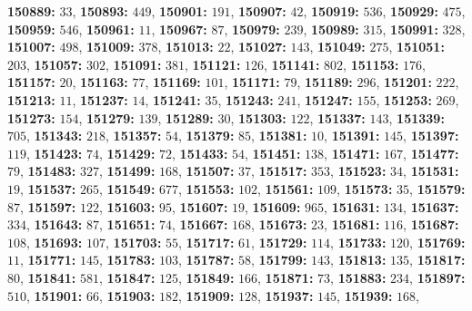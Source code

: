 \textsf{\bfseries 150889:} $33$, \textsf{\bfseries 150893:} $449$, \textsf{\bfseries 150901:} $191$, \textsf{\bfseries 150907:} $42$, \textsf{\bfseries 150919:} $536$, \textsf{\bfseries 150929:} $475$, \textsf{\bfseries 150959:} $546$, \textsf{\bfseries 150961:} $11$, \textsf{\bfseries 150967:} $87$, \textsf{\bfseries 150979:} $239$, \textsf{\bfseries 150989:} $315$, \textsf{\bfseries 150991:} $328$, \textsf{\bfseries 151007:} $498$, \textsf{\bfseries 151009:} $378$, \textsf{\bfseries 151013:} $22$, \textsf{\bfseries 151027:} $143$, \textsf{\bfseries 151049:} $275$, \textsf{\bfseries 151051:} $203$, \textsf{\bfseries 151057:} $302$, \textsf{\bfseries 151091:} $381$, \textsf{\bfseries 151121:} $126$, \textsf{\bfseries 151141:} $802$, \textsf{\bfseries 151153:} $176$, \textsf{\bfseries 151157:} $20$, \textsf{\bfseries 151163:} $77$, \textsf{\bfseries 151169:} $101$, \textsf{\bfseries 151171:} $79$, \textsf{\bfseries 151189:} $296$, \textsf{\bfseries 151201:} $222$, \textsf{\bfseries 151213:} $11$, \textsf{\bfseries 151237:} $14$, \textsf{\bfseries 151241:} $35$, \textsf{\bfseries 151243:} $241$, \textsf{\bfseries 151247:} $155$, \textsf{\bfseries 151253:} $269$, \textsf{\bfseries 151273:} $154$, \textsf{\bfseries 151279:} $139$, \textsf{\bfseries 151289:} $30$, \textsf{\bfseries 151303:} $122$, \textsf{\bfseries 151337:} $143$, \textsf{\bfseries 151339:} $705$, \textsf{\bfseries 151343:} $218$, \textsf{\bfseries 151357:} $54$, \textsf{\bfseries 151379:} $85$, \textsf{\bfseries 151381:} $10$, \textsf{\bfseries 151391:} $145$, \textsf{\bfseries 151397:} $119$, \textsf{\bfseries 151423:} $74$, \textsf{\bfseries 151429:} $72$, \textsf{\bfseries 151433:} $54$, \textsf{\bfseries 151451:} $138$, \textsf{\bfseries 151471:} $167$, \textsf{\bfseries 151477:} $79$, \textsf{\bfseries 151483:} $327$, \textsf{\bfseries 151499:} $168$, \textsf{\bfseries 151507:} $37$, \textsf{\bfseries 151517:} $353$, \textsf{\bfseries 151523:} $34$, \textsf{\bfseries 151531:} $19$, \textsf{\bfseries 151537:} $265$, \textsf{\bfseries 151549:} $677$, \textsf{\bfseries 151553:} $102$, \textsf{\bfseries 151561:} $109$, \textsf{\bfseries 151573:} $35$, \textsf{\bfseries 151579:} $87$, \textsf{\bfseries 151597:} $122$, \textsf{\bfseries 151603:} $95$, \textsf{\bfseries 151607:} $19$, \textsf{\bfseries 151609:} $965$, \textsf{\bfseries 151631:} $134$, \textsf{\bfseries 151637:} $334$, \textsf{\bfseries 151643:} $87$, \textsf{\bfseries 151651:} $74$, \textsf{\bfseries 151667:} $168$, \textsf{\bfseries 151673:} $23$, \textsf{\bfseries 151681:} $116$, \textsf{\bfseries 151687:} $108$, \textsf{\bfseries 151693:} $107$, \textsf{\bfseries 151703:} $55$, \textsf{\bfseries 151717:} $61$, \textsf{\bfseries 151729:} $114$, \textsf{\bfseries 151733:} $120$, \textsf{\bfseries 151769:} $11$, \textsf{\bfseries 151771:} $145$, \textsf{\bfseries 151783:} $103$, \textsf{\bfseries 151787:} $58$, \textsf{\bfseries 151799:} $143$, \textsf{\bfseries 151813:} $135$, \textsf{\bfseries 151817:} $80$, \textsf{\bfseries 151841:} $581$, \textsf{\bfseries 151847:} $125$, \textsf{\bfseries 151849:} $166$, \textsf{\bfseries 151871:} $73$, \textsf{\bfseries 151883:} $234$, \textsf{\bfseries 151897:} $510$, \textsf{\bfseries 151901:} $66$, \textsf{\bfseries 151903:} $182$, \textsf{\bfseries 151909:} $128$, \textsf{\bfseries 151937:} $145$, \textsf{\bfseries 151939:} $168$, 
